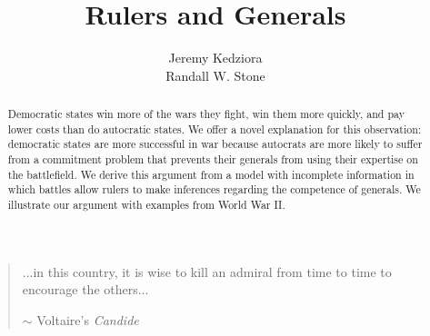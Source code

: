 \documentclass[11pt,]{article}
\title{Rulers and Generals}
\author{Jeremy Kedziora\\ Randall W. Stone}
\begin{document}
\maketitle

\begin{abstract}
\noindent Democratic states win more of the wars they fight, win them more quickly, and pay lower costs than do autocratic states.  We offer a novel explanation for this observation: democratic states are more successful in war because autocrats are more likely to suffer from a commitment problem that prevents their generals from using their expertise on the battlefield.  We derive this argument from a model with incomplete information in which battles allow rulers to make inferences regarding the competence of generals.  We illustrate our argument with examples from World War II. %

\end{abstract}

\begin{quotation}\begin{center}...in this country, it is wise to kill an admiral from time to time to encourage the others...
\begin{flushright}$\sim$ Voltaire's \textit{Candide}\end{flushright}
\end{center}
\end{quotation}
\doublespace
\end{document}
